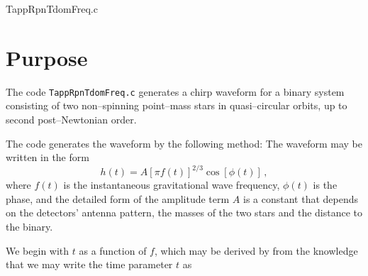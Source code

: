 \documentclass[12pt]{article}
\begin{document}
\huge
\begin{center}
TappRpnTdomFreq.c
\end{center}
\normalsize
\vspace{10mm}

\section{Purpose}

The code \texttt{TappRpnTdomFreq.c} generates a chirp waveform for a binary system consisting of two non--spinning point--mass stars in quasi--circular orbits, up to second post--Newtonian order.


The code generates the waveform by the following method:
The waveform may be written in the form
\begin{equation}
h(t) = A \left[ \pi f(t) \right]^{2/3} \cos \left[ \phi (t) \right] \,,
\label{waveform1}
\end{equation}
where $f(t)$ is the instantaneous gravitational wave frequency, $\phi(t)$ is the  phase, and the detailed form of the amplitude term $A$ is a constant that depends on the detectors' antenna pattern, the masses of the two stars and the distance to the binary.

We begin with $t$ as a function of $f$, which may be derived by from the knowledge that we may write the time parameter $t$ as
\end{document}

